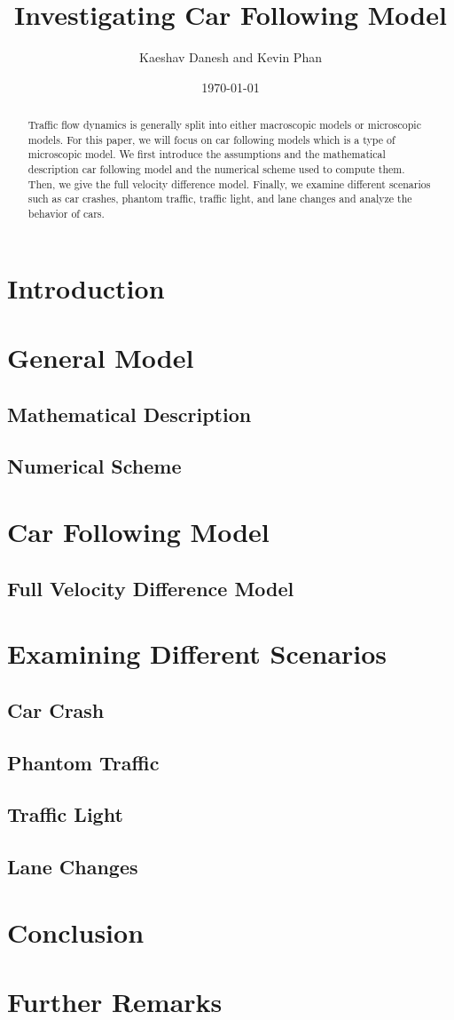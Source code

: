 \documentclass[12pt]{article}
\title{Investigating Car Following Model}
\author{Kaeshav Danesh and Kevin Phan}
\date{\today}
\begin{document}
    \maketitle

    \begin{abstract}
        Traffic flow dynamics is generally split into either macroscopic models or microscopic models. For this paper, we will focus on car following models which is a type of microscopic model. We first introduce the assumptions and the mathematical description car following model and the numerical scheme used to compute them. Then, we give the full velocity difference model. Finally, we examine different scenarios such as car crashes, phantom traffic, traffic light, and lane changes and analyze the behavior of cars. 
    \end{abstract}

    \tableofcontents

    \section{Introduction}
    

    \section{General Model}
    \subsection{Mathematical Description}\label{ch1}
    \subsection{Numerical Scheme}
    \section{Car Following Model}
    \subsection{Full Velocity Difference Model}
    \section{Examining Different Scenarios}
    \subsection{Car Crash}
    \subsection{Phantom Traffic}
    \subsection{Traffic Light}
    \subsection{Lane Changes}
    \section{Conclusion}
    \section{Further Remarks}
    \printunsrtglossary[type=symbols,style=long,title={List of Symbols}]
    \newpage 
    \printbibliography
\end{document}
